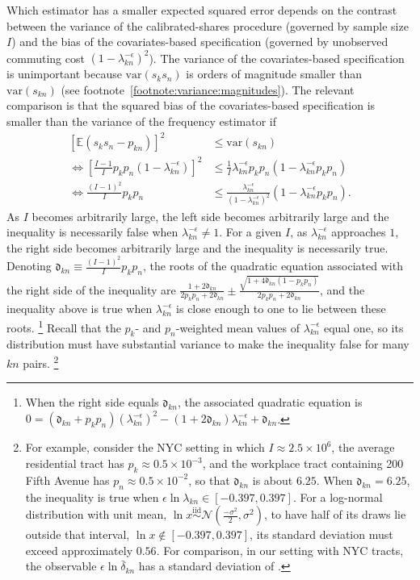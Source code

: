 \documentclass[11pt]{article}
\theoremstyle{definition}
\begin{document}
Which estimator has a smaller expected squared error depends on the contrast between
the variance of the calibrated-shares procedure (governed by sample size $I$) and the bias of the covariates-based specification (governed by unobserved commuting cost $(1- \lambda^{-\epsilon}_{kn})^2$).
The variance of the covariates-based specification is unimportant because
$\mathrm{var}(s_k s_n)$ is orders of magnitude smaller than $\mathrm{var}(s_{kn})$
(see footnote~\ref{footnote:variance:magnitudes}).
The relevant comparison is that the squared bias of the covariates-based specification is smaller than the variance of the frequency estimator if
\begin{align*}
\left[\mathbb{E}(s_k s_n - p_{kn})\right]^2 
&\leq 
\mathrm{var}(s_{kn})
\\
\iff
\left[\frac{I-1}{I} p_k p_n (1- \lambda^{-\epsilon}_{kn})\right]^2
&\leq
\frac{1}{I} \lambda^{-\epsilon}_{kn}p_k p_n (1-\lambda^{-\epsilon}_{kn}p_k p_n )
\\
\iff
\frac{(I-1)^2}{I} p_k p_n
&\leq
\frac{\lambda^{-\epsilon}_{kn}}{\left(1- \lambda^{-\epsilon}_{kn}\right)^2} (1 - \lambda^{-\epsilon}_{kn} p_k p_n)
.\end{align*}
As $I$ becomes arbitrarily large, the left side becomes arbitrarily large and the inequality is necessarily false when $\lambda^{-\epsilon}_{kn} \neq 1$.
For a given $I$, as $\lambda^{-\epsilon}_{kn}$ approaches $1$, the right side becomes arbitrarily large and the inequality is necessarily true.
Denoting $\mathfrak{d}_{kn} \equiv \frac{(I-1)^2}{I} p_k p_n$,
the roots of the quadratic equation associated with the right side of the inequality are
$\frac{1 + 2 \mathfrak{d}_{kn}}{2 p_k p_n + 2 \mathfrak{d}_{kn}} \pm \frac{\sqrt{1+4\mathfrak{d}_{kn}(1 - p_k p_n)}}{2 p_k p_n + 2 \mathfrak{d}_{kn}}$,
and
the inequality above is true when $\lambda^{-\epsilon}_{kn}$ is close enough to one to lie between these roots.%
\footnote{
    When the right side equals $\mathfrak{d}_{kn}$,
    the associated quadratic equation is 
    $0 = (\mathfrak{d}_{kn} + p_k p_n) \left(\lambda^{-\epsilon}_{kn}\right)^2 - (1 + 2\mathfrak{d}_{kn}) \lambda^{-\epsilon}_{kn} + \mathfrak{d}_{kn}$.
}
Recall that the $p_k$- and $p_n$-weighted mean values of $\lambda^{-\epsilon}_{kn}$ equal one,
so its distribution must have substantial variance to make the inequality false for many $kn$ pairs.%
\footnote{
    For example, consider the NYC setting in which
    $I \approx 2.5 \times 10^6$, the average residential tract has $p_k \approx 0.5 \times 10^{-3}$,
    and the workplace tract containing 200 Fifth Avenue has $p_n \approx 0.5 \times 10^{-2}$,
    so that $\mathfrak{d}_{kn}$ is about $6.25$.
    When $\mathfrak{d}_{kn} = 6.25$, the inequality is true when
    $\epsilon \ln \lambda_{kn} \in [-0.397,0.397]$.
    For a log-normal distribution with unit mean,
    $\ln x \stackrel{\text{iid}}{\sim} \mathcal{N}(\frac{-\sigma^2}{2},\sigma^2)$,
    to have half of its draws lie outside that interval,
    $\ln x \not\in [-0.397,0.397]$,
    its standard deviation must exceed approximately $0.56$.
    For comparison, in our setting with NYC tracts, the observable $\epsilon \ln \bar{\delta}_{kn}$ has a standard deviation of \unskip.
}
\end{document}
